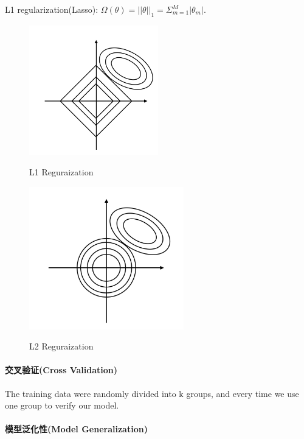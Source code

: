 L1 regularization(Lasso): $\Omega(\theta) = ||\theta||_1 = \Sigma_{m=1}^M|\theta_m|.$

\begin{figure}[h]
  \begin{minipage}{0.48\linewidth}
    \centerline{\includegraphics[width = 0.5\textwidth]{ref/L1}}
    \label{L1}
    \caption{L1 Reguraization}
  \end{minipage}
\hfill
\begin{minipage}{0.48\linewidth}
  \centerline{\includegraphics[width = 0.6\textwidth]{ref/L2}}
    \label{L2}
    \caption{L2 Reguraization}
\end{minipage}
\end{figure}

\paragraph{交叉验证(Cross Validation)} The training data were randomly divided into k groups, and every time we use one group to verify our model.


\paragraph{模型泛化性(Model Generalization)} 

